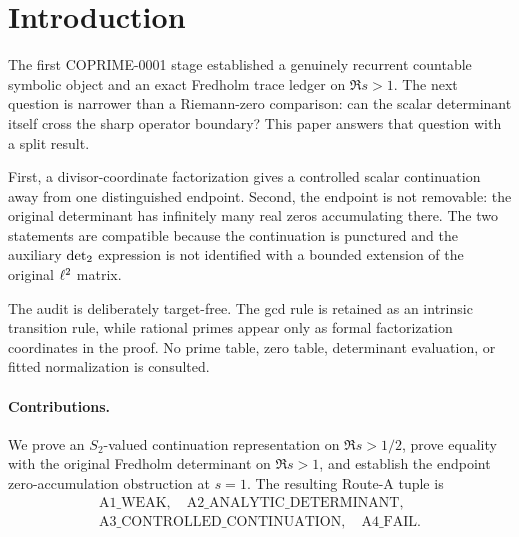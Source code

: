 \section{Introduction}

The first COPRIME-0001 stage established a genuinely recurrent countable
symbolic object and an exact Fredholm trace ledger on \(\Re s>1\).  The next
question is narrower than a Riemann-zero comparison: can the scalar determinant
itself cross the sharp operator boundary?  This paper answers that question
with a split result.

First, a divisor-coordinate factorization gives a controlled scalar
continuation away from one distinguished endpoint.  Second, the endpoint is
not removable: the original determinant has infinitely many real zeros
accumulating there.  The two statements are compatible because the continuation
is punctured and the auxiliary \(\operatorname{det}_{2}\) expression is not identified with a
bounded extension of the original \(\ell^2\) matrix.

The audit is deliberately target-free.  The gcd rule is retained as an
intrinsic transition rule, while rational primes appear only as formal
factorization coordinates in the proof.  No prime table, zero table,
determinant evaluation, or fitted normalization is consulted.

\paragraph{Contributions.}
We prove an \(S_2\)-valued continuation representation on
\(\Re s>1/2\), prove equality with the original Fredholm determinant on
\(\Re s>1\), and establish the endpoint zero-accumulation obstruction at
\(s=1\).  The resulting Route-A tuple is
\[
\begin{gathered}
\mathrm{A1\_WEAK},\quad \mathrm{A2\_ANALYTIC\_DETERMINANT},\\
\mathrm{A3\_CONTROLLED\_CONTINUATION},\quad \mathrm{A4\_FAIL}.
\end{gathered}
\]
